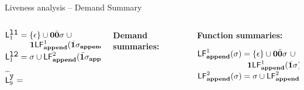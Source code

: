 \documentclass[xcolor=x11names,compress,mathserif]{beamer}
\renewcommand{\(}{\begin{columns}}
\renewcommand{\)}{\end{columns}}
\newcommand{\<}[1]{\begin{column}{#1}}
\renewcommand{\>}{\end{column}}
\begin{document}
\begin{frame}{Liveness analysis -- Demand Summary}
\begin{columns}[c]
\begin{column}[T]{0.40\textwidth}
\bigskip

$\mathsf{L}_{{1}}^{\mbox{\tt l1}} = \{\epsilon\} \cup  \mathbf{0}\bar{\mathbf{0}}\sigma\; \cup $\\
$\;\;\;\;\;\;\;\;\;\;\;\mathbf{1}\mathsf{LF}_{\mathit {\mathbf{append}}}^{1}( {\mathit {\bar{\mathbf{1}}}\sigma_{\mathbf{append}}})$\\
$\mathsf{L}_{{1}}^{\mbox{\tt l2}} = \sigma \cup \mathsf{LF}_{\mathit {\mathbf{append}}}^{2}( {\mathit {\bar{\mathbf{1}}}\sigma_{\mathbf{append}}})$\\
\ldots\\
$\mathsf{L}_{{9}}^{\mbox{\tt y}}  = $  \\


 \end{column}
 \begin{column}[T]{0.30\textwidth}
\scriptsize
\centerline{\bf Demand summaries:}
 \end{column}
 \begin{column}[T]{0.38\textwidth}
\scriptsize
\centerline{\bf Function summaries:}
\bigskip
$\mathsf{LF}_{\mathit {\mathbf{append}}}^{1}( {\mathit \sigma}) = \{\epsilon\} \cup \mathbf{0}\bar{\mathbf{0}}\sigma ~
\cup$ \\ 
$ \;\;\;\;\;\;\;\;\;\;\;\;\;\;\;\;\;\;\;\;\;\;\mathbf{1}\mathsf{LF}_{\mathit {\mathbf{append}}}^{1}( {\mathit {\bar{\mathbf{1}}}\sigma})$\\
$\mathsf{LF}_{\mathit {\mathbf{append}}}^{2}( {\mathit \sigma}) = \sigma \cup \mathsf{LF}_{\mathit {\mathbf{append}}}^{2}( {\mathit {\bar{\mathbf{1}}}\sigma})$
 \end{column}
\end{columns}
\end{frame}



\end{document}

